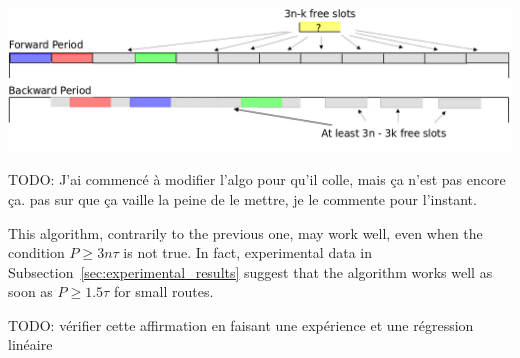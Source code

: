 \documentclass[a4paper,10pt]{article}
\newcommand{\todo}[1]{{\color{red} TODO: {#1}}}
\begin{document}
      \begin{center}
      \includegraphics[scale=0.3]{ex3nt.png}
      \end{center}
% 
% 
% 
\todo{J'ai commencé à modifier l'algo pour qu'il colle, mais ça n'est pas encore ça. 
pas sur que ça vaille la peine de le mettre, je le commente pour l'instant.}
	
This algorithm, contrarily to the previous one, may work well, even when the condition $P \geq 3n\tau$ is not true.
In fact, experimental data in Subsection~\ref{sec:experimental_results} suggest that the algorithm works well as soon as $P \geq 1.5 \tau$ for small routes.

\todo{vérifier cette affirmation en faisant une expérience et une régression linéaire}
\end{document}
